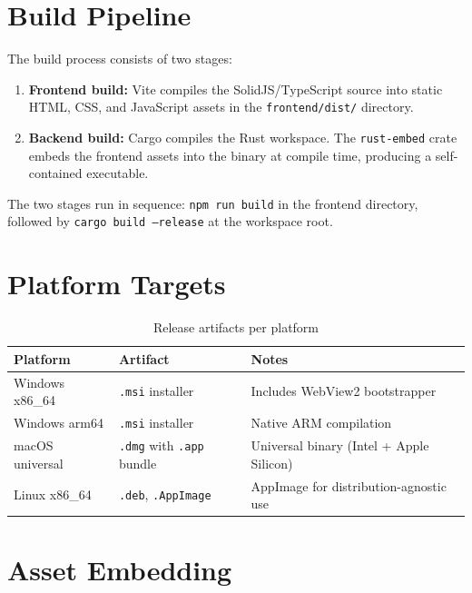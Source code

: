 \documentclass[a4paper, 11pt, oneside]{report}
\begin{document}
\section{Build Pipeline}
\label{sec:build-pipeline}

The build process consists of two stages:

\begin{enumerate}
  \item \textbf{Frontend build:} Vite compiles the SolidJS/TypeScript source
        into static HTML, CSS, and JavaScript assets in the
        \texttt{frontend/dist/} directory.
  \item \textbf{Backend build:} Cargo compiles the Rust workspace.  The
        \texttt{rust-embed} crate embeds the frontend assets into the binary
        at compile time, producing a self-contained executable.
\end{enumerate}

The two stages run in sequence: \texttt{npm run build} in the frontend
directory, followed by \texttt{cargo build --release} at the workspace root.

\section{Platform Targets}
\label{sec:platform-targets}

\begin{table}[H]
  \centering
  \caption{Release artifacts per platform}
  \label{tab:artifacts}
  \begin{tabularx}{\textwidth}{l l X}
    \toprule
    \textbf{Platform} & \textbf{Artifact} & \textbf{Notes} \\
    \midrule
    Windows x86\_64  & \texttt{.msi} installer & Includes WebView2 bootstrapper \\
    Windows arm64    & \texttt{.msi} installer & Native ARM compilation \\
    macOS universal  & \texttt{.dmg} with \texttt{.app} bundle & Universal binary (Intel + Apple Silicon) \\
    Linux x86\_64    & \texttt{.deb}, \texttt{.AppImage} & AppImage for distribution-agnostic use \\
    \bottomrule
  \end{tabularx}
\end{table}

\section{Asset Embedding}
\label{sec:asset-embedding}
\end{document}
